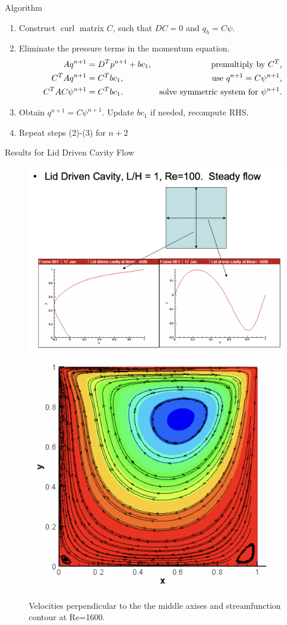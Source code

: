 \documentclass{beamer}
\begin{document}
	\begin{frame}{Algorithm}
	\begin{enumerate}
		\item Construct $\operatorname{curl}$ matrix $C$, such that $DC=0$ and $q_h=C\psi$.
		\item Eliminate the pressure terms in the momentum equation.
		\begin{align}
			Aq^{n+1}&=D^Tp^{n+1}+bc_1, &\text{ premultiply by $C^T$,} \notag\\
			C^TAq^{n+1}&=C^Tbc_1, &\text{ use $q^{n+1}=C\psi^{n+1}$,}\notag\\
			C^TAC\psi^{n+1}&=C^Tbc_1\label{eqn:resulting-system}.&\text{solve symmetric system for $\psi^{n+1}$.}
		\end{align}
		\item Obtain $q^{n+1}=C\psi^{n+1}$. Update $bc_1$ if needed, recompute RHS. 
		\item Repeat steps (2)-(3) for $n+2$
	\end{enumerate}
	\end{frame}
	
	
	\begin{frame}{Results for Lid Driven Cavity Flow}
	\begin{figure}
	\centering
	  \includegraphics[height=0.395\textwidth]{fig2}
	  \includegraphics[height=0.395\textwidth]{fig3}\caption{Velocities perpendicular to the the middle axises and streamfunction contour at Re=1600.}
	\end{figure}
	\end{frame}
	
\end{document}
